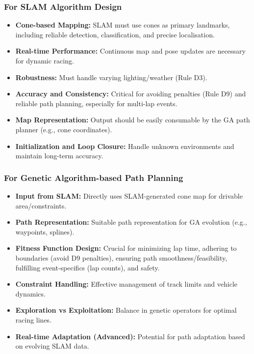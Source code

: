 \subsubsection{For SLAM Algorithm Design}
\begin{itemize}
    \item \textbf{Cone-based Mapping:} SLAM must use cones as primary landmarks, including reliable detection, classification, and precise localisation.
    \item \textbf{Real-time Performance:} Continuous map and pose updates are necessary for dynamic racing.
    \item \textbf{Robustness:} Must handle varying lighting/weather (Rule D3).
    \item \textbf{Accuracy and Consistency:} Critical for avoiding penalties (Rule D9) and reliable path planning, especially for multi-lap events.
    \item \textbf{Map Representation:} Output should be easily consumable by the GA path planner (e.g., cone coordinates).
    \item \textbf{Initialization and Loop Closure:} Handle unknown environments and maintain long-term accuracy.
\end{itemize}

\subsubsection{For Genetic Algorithm-based Path Planning}
\begin{itemize}
    \item \textbf{Input from SLAM:} Directly uses SLAM-generated cone map for drivable area/constraints.
    \item \textbf{Path Representation:} Suitable path representation for GA evolution (e.g., waypoints, splines).
    \item \textbf{Fitness Function Design:} Crucial for minimizing lap time, adhering to boundaries (avoid D9 penalties), ensuring path smoothness/feasibility, fulfilling event-specifics (lap counts), and safety.
    \item \textbf{Constraint Handling:} Effective management of track limits and vehicle dynamics.
    \item \textbf{Exploration vs Exploitation:} Balance in genetic operators for optimal racing lines.
    \item \textbf{Real-time Adaptation (Advanced):} Potential for path adaptation based on evolving SLAM data.
\end{itemize}

